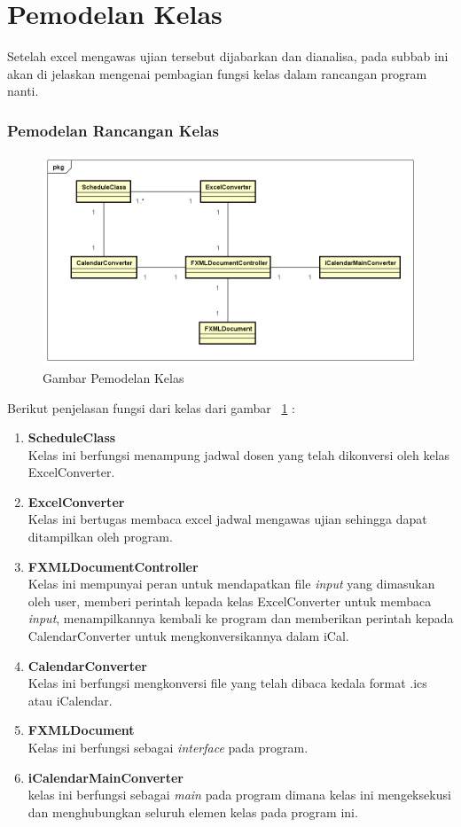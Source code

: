 \section{Pemodelan Kelas}
Setelah excel mengawas ujian tersebut dijabarkan dan dianalisa, pada subbab ini akan di jelaskan mengenai pembagian fungsi
kelas dalam rancangan program nanti.

\subsubsection{Pemodelan Rancangan Kelas}
\begin{figure}[H]
	\centering
	\includegraphics[scale=0.5]{Gambar/pemodelan-kelas}
	\caption{Gambar Pemodelan Kelas}
	\label{fig:pemodelan-kelas}
\end{figure}

Berikut penjelasan fungsi dari kelas dari gambar ~\ref{fig:pemodelan-kelas} :	
\begin{enumerate}
	\item \textbf{ScheduleClass}\\
	Kelas ini berfungsi menampung jadwal dosen yang telah dikonversi oleh kelas ExcelConverter.
	\item \textbf{ExcelConverter}\\
	Kelas ini bertugas membaca excel jadwal mengawas ujian sehingga dapat ditampilkan oleh program.
	\item \textbf{FXMLDocumentController}\\
	Kelas ini mempunyai peran untuk mendapatkan file \textit{input} yang dimasukan oleh user,  memberi perintah 
	kepada kelas ExcelConverter untuk membaca \textit{input}, menampilkannya kembali ke program dan memberikan perintah
	kepada CalendarConverter untuk mengkonversikannya dalam iCal.
	\item \textbf{CalendarConverter}\\
	Kelas ini berfungsi mengkonversi file yang telah dibaca kedala format .ics atau iCalendar.
	\item \textbf{FXMLDocument}\\
	Kelas ini berfungsi sebagai \textit{interface} pada program.
	\item \textbf{iCalendarMainConverter}\\
	kelas ini berfungsi sebagai \textit{main} pada program dimana kelas ini mengeksekusi dan menghubungkan seluruh elemen kelas 
	pada program ini.
\end{enumerate}
